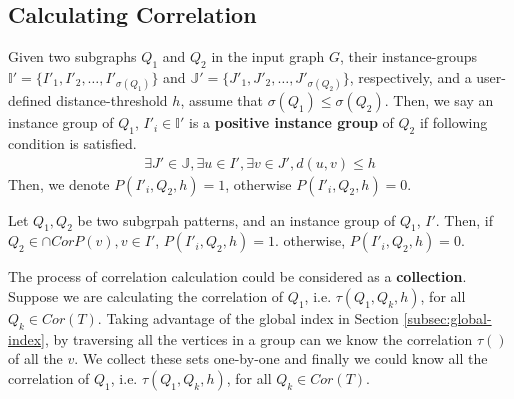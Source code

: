 \subsection{Calculating Correlation}\label{subsec:calculating}
\begin{defn}
	Given two subgraphs $Q_1$ and $Q_2$ in the input graph $G$, their instance-groups
	$\mathbb{I'}=\{I'_1,I'_2,\ldots,I'_{\sigma(Q_1)}\}$ and $\mathbb{J'}=\{J'_1,J'_2,\ldots,J'_{\sigma(Q_2)}\}$,
	respectively, and a user-defined distance-threshold $h$, assume that $\sigma(Q_1) \le \sigma(Q_2)$.
	Then, we say an instance group of $Q_1$, $I'_i\in \mathbb{I'}$ is a {\bf positive instance group} of $Q_2$ if following condition is satisfied.
	\begin{align}
		\exists J' \in \mathbb{J}, \exists u \in I', \exists v \in J', d(u,v)\le h
	\end{align}
	Then, we denote $P(I'_i,Q_2,h)=1$, otherwise $P(I'_i,Q_2,h)=0$.
\end{defn}
\begin{thrm}
	Let $Q_1,Q_2$ be two subgrpah patterns, and an instance group of $Q_1$, $I'$. Then,	if $Q_2\in \cap CorP(v),v\in I'$, $P(I'_i,Q_2,h)=1$.
	otherwise, $P(I'_i,Q_2,h)=0$.
\end{thrm}
The process of correlation calculation could be considered as a {\bf collection}. Suppose we are calculating the correlation of $Q_1$, i.e. $\tau(Q_1,Q_k,h)$, for all $Q_k\in Cor(T)$. Taking advantage of the global index in Section \ref{subsec:global-index}, by traversing all the vertices in a group can we know the correlation $\tau()$ of all the $v$. We collect these sets one-by-one and finally we could know all the correlation of $Q_1$, i.e. $\tau(Q_1,Q_k,h)$, for all $Q_k\in Cor(T)$.

